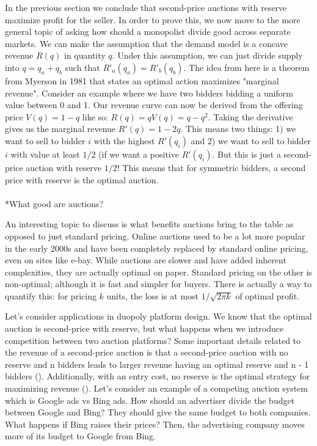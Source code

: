 \documentclass[
  letterpaper,
  numbers=noenddot,
  DIV=11,
  oneside]{scrreprt}
\makeatletter
\let\oldparagraph\paragraph
\renewcommand{\paragraph}{
    \@ifstar
      \xxxParagraphStar
      \xxxParagraphNoStar
  }
\newcommand{\xxxParagraphStar}[1]{\oldparagraph*{#1}\mbox{}}
\newcommand{\xxxParagraphNoStar}[1]{\oldparagraph{#1}\mbox{}}
\theoremstyle{remark}
\makeatother
\begin{document}
In the previous section we conclude that second-price auctions with
reserve maximize profit for the seller. In order to prove this, we now
move to the more general topic of asking how should a monopolist divide
good across separate markets. We can make the assumption that the demand
model is a concave revenue \(R(q)\) in quantity \(q\). Under this
assumption, we can just divide supply into \(q = q_a + q_b\) such that
\(R'_a(q_a) = R'_b(q_b)\). The idea from here is a theorem from Myerson
in 1981 that states an optimal action maximizes "marginal revenue".
Consider an example where we have two bidders bidding a uniform value
between 0 and 1. Our revenue curve can now be derived from the offering
price \(V(q) = 1 - q\) like so: \(R(q) = qV(q) = q - q^2\). Taking the
derivative gives us the marginal revenue \(R'(q) = 1-2q\). This means
two things: 1) we want to sell to bidder \(i\) with the highest
\(R'(q_i)\) and 2) we want to sell to bidder \(i\) with value at least
\(1/2\) (if we want a positive \(R'(q_i)\). But this is just a
second-price auction with reserve \(1/2\)! This means that for symmetric
bidders, a second price with reserve is the optimal auction.

\paragraph*{What good are auctions?}\label{what-good-are-auctions}

An interesting topic to discuss is what benefits auctions bring to the
table as opposed to just standard pricing. Online auctions used to be a
lot more popular in the early 2000s and have been completely replaced by
standard online pricing, even on sites like e-bay. While auctions are
slower and have added inherent complexities, they are actually optimal
on paper. Standard pricing on the other is non-optimal; although it is
fast and simpler for buyers. There is actually a way to quantify this:
for pricing \(k\) units, the loss is at most \(1 / \sqrt{2\pi k}\) of
optimal profit.

Let's consider applications in duopoly platform design. We know that the
optimal auction is second-price with reserve, but what happens when we
introduce competition between two auction platforms? Some important
details related to the revenue of a second-price auction is that a
second-price auction with no reserve and n bidders leads to larger
revenue having an optimal reserve and n - 1 bidders
().
Additionally, with an entry cost, no reserve is the optimal strategy for
maximizing revenue ().
Let's consider an example of a competing auction system which is Google
ads vs Bing ads. How should an advertiser divide the budget between
Google and Bing? They should give the same budget to both companies.
What happens if Bing raises their prices? Then, the advertising company
moves more of its budget to Google from Bing.
\end{document}
